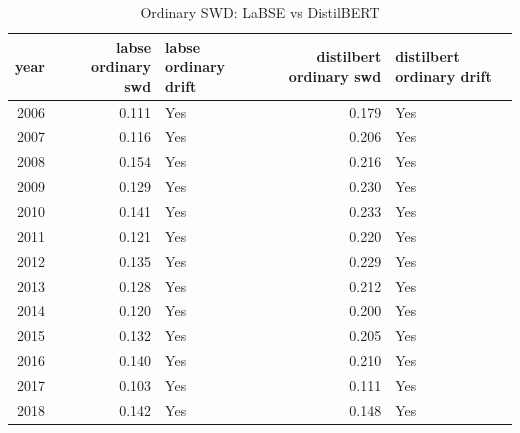\begin{table}[ht]
\centering
\caption{Ordinary SWD: LaBSE vs DistilBERT}
\label{tab:labse_vs_distilbert_ordinary_swd}
\begin{tabular}{rrlrl}
\toprule
year & labse ordinary swd & labse ordinary drift & distilbert ordinary swd & distilbert ordinary drift \\
\midrule
2006 & 0.111 & Yes & 0.179 & Yes \\
2007 & 0.116 & Yes & 0.206 & Yes \\
2008 & 0.154 & Yes & 0.216 & Yes \\
2009 & 0.129 & Yes & 0.230 & Yes \\
2010 & 0.141 & Yes & 0.233 & Yes \\
2011 & 0.121 & Yes & 0.220 & Yes \\
2012 & 0.135 & Yes & 0.229 & Yes \\
2013 & 0.128 & Yes & 0.212 & Yes \\
2014 & 0.120 & Yes & 0.200 & Yes \\
2015 & 0.132 & Yes & 0.205 & Yes \\
2016 & 0.140 & Yes & 0.210 & Yes \\
2017 & 0.103 & Yes & 0.111 & Yes \\
2018 & 0.142 & Yes & 0.148 & Yes \\
\bottomrule
\end{tabular}
\end{table}
